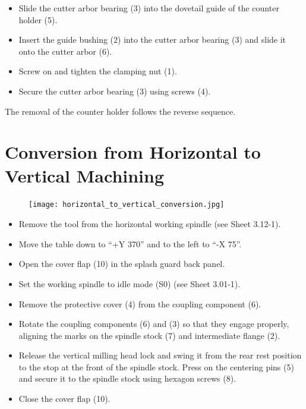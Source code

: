
\begin{itemize}
    \item Slide the cutter arbor bearing (3) into the dovetail guide of the counter holder (5).
    \item Insert the guide bushing (2) into the cutter arbor bearing (3) and slide it onto the cutter arbor (6).
    \item Screw on and tighten the clamping nut (1).
    \item Secure the cutter arbor bearing (3) using screws (4).
\end{itemize}

\noindent The removal of the counter holder follows the reverse sequence.\footnotemark

\vspace{0.3cm}


\section{Conversion from Horizontal to Vertical Machining}
\setcounter{section}{7}

\begin{figure}[h]
    \centering
    \texttt{[image: horizontal\_to\_vertical\_conversion.jpg]}
    \label{fig:horizontal_to_vertical_conversion}
\end{figure}

\vspace{0.3cm}

\begin{itemize}
    \item Remove the tool from the horizontal working spindle (see Sheet 3.12-1).
    \item Move the table down to \enquote{+Y 370} and to the left to \enquote{-X 75}.\footnotemark
    \item Open the cover flap (10) in the splash guard back panel.
    \item Set the working spindle to idle mode (S0) (see Sheet 3.01-1).
    \item Remove the protective cover (4) from the coupling component (6).
    \item Rotate the coupling components (6) and (3) so that they engage properly, aligning the marks on the spindle stock (7) and intermediate flange (2).
    \item Release the vertical milling head lock and swing it from the rear rest position to the stop at the front of the spindle stock. Press on the centering pins (5) and secure it to the spindle stock using hexagon screws (8).
    \item Close the cover flap (10).
\end{itemize}

